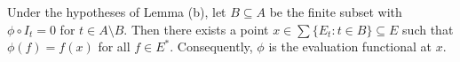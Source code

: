 Under the hypotheses of Lemma (b), let $B \subseteq A$ be the finite subset with $\phi \circ I_t = 0$ for $t \in A \setminus B$. Then there exists a point $x \in \sum \{E_t : t \in B\} \subseteq E$ such that $\phi(f) = f(x)$ for all $f \in E^*$. Consequently, $\phi$ is the evaluation functional at $x$.
